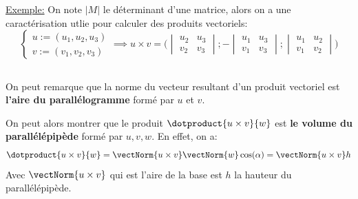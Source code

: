 \underline{Exemple:} On note \(\big|M\big|\) le déterminant d'une matrice, alors on a une caractérisation utlie pour calculer des produits vectoriels:
\[
   \begin{cases}
      u := (u_1, u_2, u_3)\\ 
      v := (v_1, v_2, v_3)
   \end{cases} \implies 
   u \times v = \Biggl(\begin{vmatrix}u_2 & u_3 \\ v_2 & v_3\end{vmatrix} ; -\begin{vmatrix}u_1 & u_3 \\ v_1 & v_3\end{vmatrix} ; \begin{vmatrix}u_1 & u_2 \\ v_1 & v_2\end{vmatrix}\Biggl)
\]

\subsection*{}
On peut remarque que la norme du vecteur resultant d'un produit vectoriel est \textbf{l'aire du parallélogramme} formé par \(u\) et \(v\).\<

On peut alors montrer que le produit \(\dotproduct{u \times v}{w}\) est \textbf{le volume du parallélépipède} formé par \(u, v, w\). En effet, on a:
\[
   \dotproduct{u \times v}{w} = \vectNorm{u \times v} \vectNorm{w} \cos(\alpha) = \vectNorm{u \times v}h
\]
Avec \(\vectNorm{u \times v}\) qui est l'aire de la base est \(h\) la hauteur du parallélépipède.

